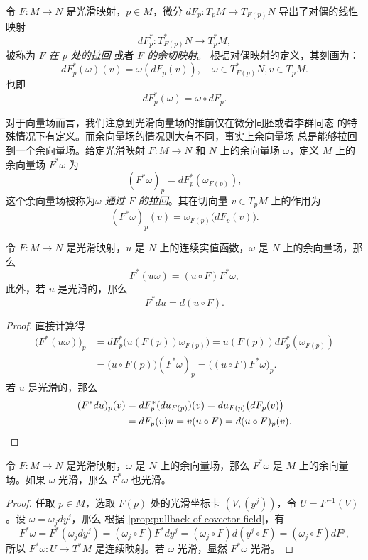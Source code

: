 \documentclass[fontset=none]{Notes}
\begin{document}
令 $F:M\to N$ 是光滑映射，$p\in M$，微分 $dF_p:T_pM\to T_{F(p)}N$
导出了对偶的线性映射
\[
  dF_p^*:T_{F(p)}^*N\to T_p^*M,  
\]
被称为 \emph{$F$ 在 $p$ 处的拉回} 或者 \emph{$F$ 的余切映射}。
根据对偶映射的定义，其刻画为：
\[
  dF_p^*(\omega)(v)= \omega(dF_p(v)),\quad \omega\in T_{F(p)}^*N,
  v\in T_pM.
\]
也即
\[
  dF_p^*(\omega)=\omega\circ dF_p.  
\]

对于向量场而言，我们注意到光滑向量场的推前仅在微分同胚或者李群同态
的特殊情况下有定义。而余向量场的情况则大有不同，事实上余向量场
总是能够拉回到一个余向量场。给定光滑映射 $F:M\to N$ 和
$N$ 上的余向量场 $\omega$，定义 $M$ 上的余向量场 $F^*\omega$
为
\[
  (F^*\omega)_p =dF_p^*(\omega_{F(p)}),
\]
这个余向量场被称为\emph{$\omega$ 通过 $F$ 的拉回}。其在切向量 $v\in T_pM$
上的作用为
\[
  (F^*\omega)_p(v)=\omega_{F(p)}\bigl(dF_p(v)\bigr)  .
\]

\begin{proposition}\label{prop:pullback of covector field}
  令 $F:M\to N$ 是光滑映射，$u$ 是 $N$ 上的连续实值函数，$\omega$ 是
  $N$ 上的余向量场，那么
  \[
    F^*(u\omega)=(u\circ F)F^*\omega,  
  \]
  此外，若 $u$ 是光滑的，那么
  \[
    F^*du=d(u\circ F).  
  \]
\end{proposition}
\begin{proof}
  直接计算得
  \begin{align*}
    \bigl(F^*(u\omega)\bigr)_p&=dF_p^*\bigl(u(F(p))\omega_{F(p)}\bigr)
    =u(F(p))dF_p^*(\omega_{F(p)})\\
    &=\bigl(u\circ F(p)\bigr) (F^*\omega)_p=\bigl((u\circ F)F^*\omega\bigr)_p.
  \end{align*}
  若 $u$ 是光滑的，那么
  \begin{align*}
    (F^*du)_p(v)&=dF_p^*(du_{F(p)})(v)=du_{F(p)}\bigl(dF_p(v)\bigr)\\
    &=dF_p(v)u=v(u\circ F)=d(u\circ F)_p(v).\qedhere
  \end{align*}
\end{proof}

\begin{proposition}
  令 $F:M\to N$ 是光滑映射，$\omega$ 是
  $N$ 上的余向量场，那么 $F^*\omega$ 是 $M$ 上的余向量场。如果
  $\omega$ 光滑，那么 $F^*\omega$ 也光滑。
\end{proposition}
\begin{proof}
  任取 $p\in M$，选取 $F(p)$ 处的光滑坐标卡 $(V,(y^j))$，令
  $U=F^{-1}(V)$。设 $\omega=\omega_jdy^j$，那么
  根据 \autoref{prop:pullback of covector field}，有
  \[
    F^*\omega=F^*\left(\omega_jdy^j\right)=
    (\omega_j\circ F)F^*dy^j=
    (\omega_j\circ F)d(y^j\circ F)=(\omega_j\circ F)dF^j,  
  \]
  所以 $F^*\omega:U\to T^*M$ 是连续映射。若 $\omega$ 光滑，显然
  $F^*\omega$ 光滑。
\end{proof}
\end{document}
